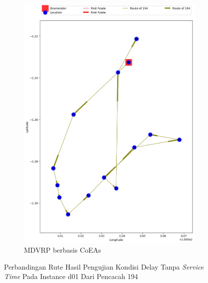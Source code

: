 \begin{figure}[H]
	\centering
	\begin{subfigure}[t]{\textwidth}
		\centering
		\includegraphics[width=\textwidth]{Resources/Images/delayed_1/real_m15_n100_delayed_1_194_coes}
		\caption{MDVRP berbasis CoEAs}
		\label{fig:real_m15_n100_delayed_1_194_coes}
	\end{subfigure}
	\caption{Perbandingan Rute Hasil Pengujian Kondisi Delay Tanpa \textit{Service Time} Pada Instance d01 Dari Pencacah 194}
	\label{fig:real_m15_n100_delayed_1_194}
\end{figure}


